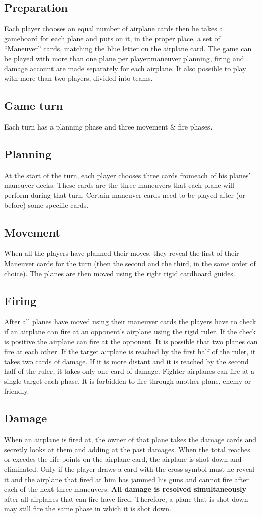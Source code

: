 \documentclass[12pt]{report}
\begin{document}
\subsection{Preparation}
Each player chooses an equal number of airplane cards then he takes a gameboard for each plane and puts on it, in the proper place, a set of “Maneuver” cards, matching the blue letter on the airplane card.
The game can be played with more than one plane per player:maneuver planning, firing and damage account are made separately for each airplane. It also possible to play with more than two players, divided into teams.
\subsection{Game turn}
Each turn has a planning phase and three movement \& fire phases.
\subsection{Planning}
 At the start of the turn, each player chooses three cards fromeach of his planes’ maneuver decks. These cards are the three maneuvers that each plane will perform during that turn.
Certain maneuver cards need to be played after (or before) some specific cards.
\subsection{Movement}
When all the players have planned their moves, they reveal the first of their Maneuver cards for the turn (then the second and the third, in the same order of choice).
The planes are then moved using the right rigid cardboard guides.
\subsection{Firing}
After all planes have moved using their maneuver cards the players have to check if an airplane can fire at an opponent’s airplane using the rigid ruler. If the check is positive the airplane can fire at the opponent. It is possible that two planes can fire at each other. 
If the target airplane is reached by the first half of the ruler, it takes two cards of damage. If it is more distant and it is reached by the second half of the ruler, it takes only one card of damage. Fighter airplanes can fire at a single target each phase. It is forbidden to fire through another plane, enemy or friendly.
\subsection{Damage}
When an airplane is fired at, the owner of that plane takes the damage cards and secretly looks at them and adding at the past damages. When the total reaches or excedes the life points on the airplane card, the airplane is shot down and eliminated.
Only if the player draws a card with the cross symbol must he reveal it and the airplane that fired at him has jammed his guns and cannot fire after each of the next three maneuvers.
\textbf{All damage is resolved simultaneously} after all airplanes that can fire have fired. Therefore, a plane that is shot down may still fire the same phase in which it is shot down.
\end{document}
